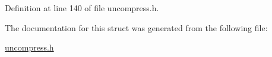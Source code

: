 Definition at line 140 of file uncompress.\+h.



The documentation for this struct was generated from the following file\+:\begin{DoxyCompactItemize}
\item 
\hyperlink{uncompress_8h}{uncompress.\+h}\end{DoxyCompactItemize}
